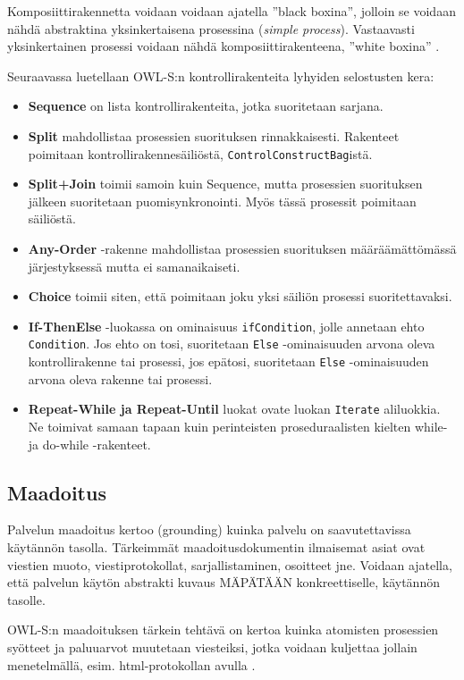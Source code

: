 \documentclass[finnish]{tktltiki2}
\theoremstyle{definition}
\theoremstyle{remark}
\begin{document}
Komposiittirakennetta voidaan voidaan ajatella ''black boxina'', jolloin se voidaan nähdä abstraktina yksinkertaisena prosessina (\textit{simple process}). Vastaavasti yksinkertainen prosessi voidaan nähdä komposiittirakenteena, ''white boxina'' \cite{OWLS}. 

Seuraavassa luetellaan OWL-S:n kontrollirakenteita lyhyiden selostusten kera:      
 
 \begin{itemize}
\item \textbf{Sequence} on lista kontrollirakenteita, jotka suoritetaan sarjana. 
\item \textbf{Split} mahdollistaa prosessien suorituksen rinnakkaisesti. Rakenteet poimitaan kontrollirakennesäiliöstä, \texttt{ControlConstructBag}istä.
\item \textbf{Split+Join} toimii samoin kuin Sequence, mutta prosessien suorituksen jälkeen suoritetaan puomisynkronointi. Myös tässä prosessit poimitaan säiliöstä. 
\item \textbf{Any-Order} -rakenne mahdollistaa prosessien suorituksen määräämättömässä järjestyksessä mutta ei samanaikaiseti. 
\item \textbf{Choice} toimii siten, että poimitaan joku yksi säiliön prosessi suoritettavaksi.
\item \textbf{If-ThenElse} -luokassa on ominaisuus \texttt{ifCondition}, jolle annetaan ehto \texttt{Condition}. Jos ehto on tosi, suoritetaan \texttt{Else} -ominaisuuden arvona oleva kontrollirakenne tai prosessi, jos epätosi, suoritetaan \texttt{Else} -ominaisuuden arvona oleva rakenne tai prosessi. 
\item \textbf{Repeat-While ja Repeat-Until} luokat ovate luokan \texttt{Iterate} aliluokkia. Ne toimivat samaan tapaan kuin perinteisten proseduraalisten kielten while- ja do-while -rakenteet.   
\end{itemize}

\subsection{Maadoitus}

Palvelun maadoitus kertoo (grounding) kuinka palvelu on saavutettavissa käytännön tasolla. Tärkeimmät maadoitusdokumentin ilmaisemat asiat ovat viestien muoto, viestiprotokollat, sarjallistaminen, osoitteet jne\cite{OWLS}. Voidaan ajatella, että palvelun käytön abstrakti kuvaus MÄPÄTÄÄN  konkreettiselle, käytännön tasolle\cite{OWLS}. 

OWL-S:n maadoituksen tärkein tehtävä on kertoa kuinka atomisten prosessien syötteet ja paluuarvot muutetaan viesteiksi, jotka voidaan kuljettaa jollain menetelmällä, esim. html-protokollan avulla \cite{OWLS}. 
\end{document}
